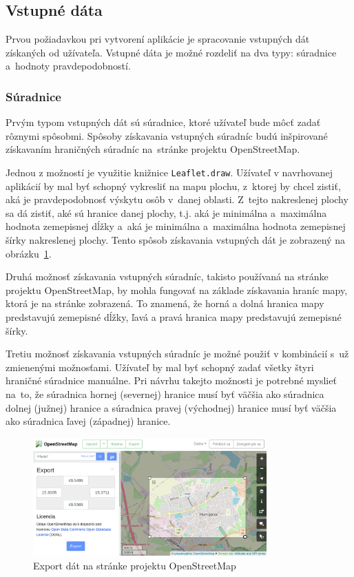 \subsection{Vstupné dáta}
Prvou požiadavkou pri vytvorení aplikácie je spracovanie vstupných dát získaných od užívateľa.
Vstupné dáta je možné rozdeliť na dva typy: súradnice a~hodnoty pravdepodobností.

\subsubsection{Súradnice}
Prvým typom vstupných dát sú súradnice, ktoré užívateľ bude môcť zadať rôznymi spôsobmi. Spôsoby získavania vstupných súradníc budú inšpirované získavaním hraničných súradníc na~stránke projektu OpenStreetMap.

Jednou z možností je využitie knižnice \texttt{Leaflet.draw}. Užívateľ v navrhovanej aplikácií by mal byť schopný vykresliť na mapu plochu, z~ktorej by chcel zistiť, aká je pravdepodobnosť výskytu osôb v~danej oblasti. Z~tejto nakreslenej plochy sa dá zistiť, aké sú hranice danej plochy, t.j. aká je minimálna a~maximálna hodnota zemepisnej dĺžky a~aká je minimálna a~maximálna hodnota zemepisnej šírky nakreslenej plochy. Tento spôsob získavania vstupných dát je zobrazený na obrázku~\ref{fig:osm-export}.

Druhá možnosť získavania vstupných súradníc, takisto používaná na stránke projektu OpenStreetMap, by mohla fungovať na základe získavania hraníc mapy, ktorá je na stránke zobrazená. To znamená, že horná a dolná hranica mapy predstavujú zemepisné dĺžky, ľavá a pravá hranica mapy predstavujú zemepisné šírky.

Tretiu možnosť získavania vstupných súradníc je možné použiť v kombinácií s~už zmienenými možnosťami. Užívateľ by mal byť schopný zadať všetky štyri hraničné súradnice manuálne. Pri návrhu takejto možnosti je potrebné myslieť na~to, že súradnica hornej (severnej) hranice musí byť väčšia ako súradnica dolnej (južnej) hranice a súradnica pravej (východnej) hranice musí byť väčšia ako súradnica ľavej (západnej) hranice.

\begin{figure}[ht]
    \centering
    \includegraphics[width=0.8\textwidth]{obrazky-figures/openstreetmap-export.png}
    \caption{Export dát na stránke projektu OpenStreetMap}
    \label{fig:osm-export}
\end{figure}
    
